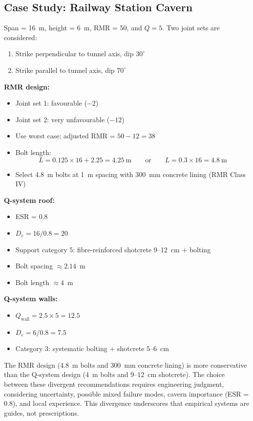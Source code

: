 \subsection{Case Study: Railway Station Cavern}
Span = 16~m, height = 6~m, RMR = 50, and $Q = 5$. Two joint sets are considered:
\begin{enumerate}
 \item Strike perpendicular to tunnel axis, dip $30^\circ$
 \item Strike parallel to tunnel axis, dip $70^\circ$
\end{enumerate}

\textbf{RMR design:}
\begin{itemize}
 \item Joint set 1: favourable ($-2$)
 \item Joint set 2: very unfavourable ($-12$)
 \item Use worst case: adjusted RMR = $50 - 12 = 38$
 \item Bolt length:
 \[
 L = 0.125\times16 + 2.25 = 4.25~\text{m}
 \qquad \text{or} \qquad
 L = 0.3\times16 = 4.8~\text{m}
 \]
 \item Select 4.8~m bolts at 1~m spacing with 300~mm concrete lining (RMR Class IV)
\end{itemize}

\textbf{Q-system roof:}
\begin{itemize}
 \item ESR = 0.8
 \item $D_e = 16/0.8 = 20$
 \item Support category 5: fibre-reinforced shotcrete 9--12~cm + bolting
 \item Bolt spacing $\approx 2.14$~m
 \item Bolt length $\approx 4$~m
\end{itemize}

\textbf{Q-system walls:}
\begin{itemize}
 \item $Q_{\text{wall}} = 2.5\times 5 = 12.5$
 \item $D_e = 6/0.8 = 7.5$
 \item Category 3: systematic bolting + shotcrete 5--6~cm
\end{itemize}

\begin{warnbox}
The RMR design (4.8~m bolts and 300~mm concrete lining) is more conservative than the Q-system design (4~m bolts and 9--12~cm shotcrete). The choice between these divergent recommendations requires engineering judgment, considering uncertainty, possible mixed failure modes, cavern importance (ESR = 0.8), and local experience. This divergence underscores that empirical systems are guides, not prescriptions.
\end{warnbox}

